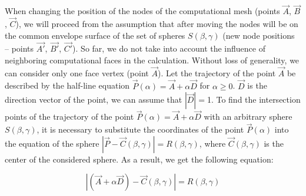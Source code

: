 \documentclass[
11pt,%
tightenlines,%
twoside,%
onecolumn,%
nofloats,%
nobibnotes,%
nofootinbib,%
superscriptaddress,%
noshowpacs,%
centertags]%
{revtex4-2}
\begin{document}
When changing the position of the nodes of the computational mesh (points $\vec{A}$, $\vec{B}$, $\vec{C}$), we will proceed from the assumption that after moving the nodes will be on the common envelope surface of the set of spheres $ S(\beta, \gamma)$ (new node positions -- points $\vec{A'}$, $\vec{B'}$, $\vec{C'}$).
So far, we do not take into account the influence of neighboring computational faces in the calculation.
Without loss of generality, we can consider only one face vertex (point $\vec{A}$).
Let the trajectory of the point $\vec{A}$ be described by the half-line equation $\vec{P}(\alpha) = \vec{A} + \alpha \vec{D}$ for $\alpha \ge 0$.
$\vec{D}$ is the direction vector of the point, we can assume that $|\vec{D}| = $1.
To find the intersection points of the trajectory of the point $\vec{P}(\alpha) = \vec{A} + \alpha \vec{D}$ with an arbitrary sphere $S(\beta, \gamma)$, it is necessary to substitute the coordinates of the point $\vec{P}(\alpha)$ into the equation of the sphere $|\vec{P} - \vec{C}(\beta, \gamma)| = R(\beta, \gamma)$, where $\vec{C}(\beta, \gamma)$ is the center of the considered sphere.
As a result, we get the following equation:

\begin{equation}\label{eqn:intersect}
|(\vec{A} + \alpha \vec{D}) - \vec{C}(\beta, \gamma)| = R(\beta, \gamma)
\end{equation}
\end{document}
